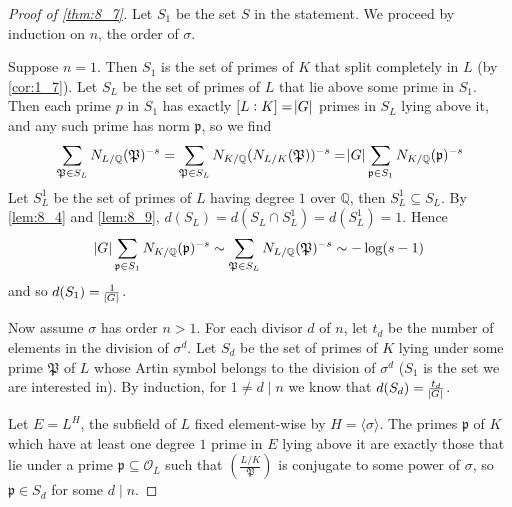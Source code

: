 \documentclass[11pt]{article}
\theoremstyle{definition}
\theoremstyle{plain}
\theoremstyle{remark}
\newcommand{\QQ}{\mathbb{Q}}
\newcommand{\cO}{\mathcal{O}}
\newcommand{\cp}{\mathfrak{P}}
\newcommand{\fp}{\mathfrak{p}}
\newcommand{\leg}[2]{\left(\frac{#1}{#2}\right)}
\begin{document}
\begin{proof}[Proof of \autoref{thm:8_7}]
    Let $S_1$ be the set $S$ in the statement.
    We proceed by induction on $n$, the order of $\sigma$.

    Suppose $n = 1$. Then $S_1$ is the set of primes of $K$ that split completely in $L$ (by \autoref{cor:1_7}). Let $S_L$ be the set of primes of $L$ that lie above some prime in $S_1$. Then each prime $p$ in $S_1$ has exactly $[L:K] = \abs{G}$ primes in $S_L$ lying above it, and any such prime has norm $\fp$, so we find
    \begin{equation*}
        \sum_{\cp \in S_L} N_{L/\QQ}(\cp)^{-s}
        = \sum_{\cp \in S_L} N_{K/\QQ}(N_{L/K}(\cp))^{-s}
        = \abs{G} \sum_{\fp \in S_1} N_{K/\QQ}(\fp)^{-s}
    \end{equation*}
    Let $S_L^1$ be the set of primes of $L$ having degree $1$ over $\QQ$, then $S_L^1 \subseteq S_L$. By \autoref{lem:8_4} and \autoref{lem:8_9}, $d(S_L) = d(S_L \cap S_L^1) = d(S_L^1) = 1$. Hence
    \begin{equation*}
        \abs{G} \sum_{\fp \in S_1} N_{K/\QQ}(\fp)^{-s} \sim \sum_{\cp \in S_L} N_{L/\QQ}(\cp)^{-s} \sim -\log(s-1)
    \end{equation*}
    and so $d(S_1) = \frac{1}{\abs{G}}$.

    Now assume $\sigma$ has order $n > 1$. For each divisor $d$ of $n$, let $t_d$ be the number of elements in the division of $\sigma^d$. Let $S_d$ be the set of primes of $K$ lying under some prime $\cp$ of $L$ whose Artin symbol belongs to the division of $\sigma^d$ ($S_1$ is the set we are interested in). By induction, for $1 \neq d \mid n$ we know that $d(S_d) = \frac{t_d}{\abs{G}}$.

    Let $E = L^H$, the subfield of $L$ fixed element-wise by $H = \langle \sigma \rangle$. The primes $\fp$ of $K$ which have at least one degree $1$ prime in $E$ lying above it are exactly those that lie under a prime $\fp \subseteq \cO_L$ such that $\leg{L/K}{\cp}$ is conjugate to some power of $\sigma$, so $\fp \in S_d$ for some $d \mid n$.


\end{proof}
\end{document}
